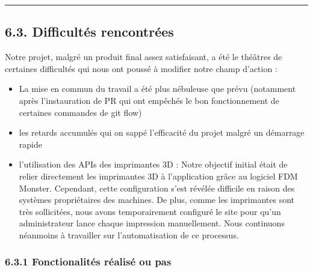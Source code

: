 \begin{center}\rule{0.5\linewidth}{0.5pt}\end{center}

\newpage

\hypertarget{difficultuxe9s-rencontruxe9es}{%
\subsection{6.3. Difficultés
rencontrées}\label{difficultuxe9s-rencontruxe9es}}

Notre projet, malgré un produit final assez satisfaisant, a été le
théâtres de certaines difficultés qui nous ont poussé à modifier notre
champ d'action :

\begin{itemize}
\item
  La mise en commun du travail a été plus nébuleuse que prévu (notamment
  après l'instauration de PR qui ont empêchés le bon fonctionnement de
  certaines commandes de git flow)
\item
  les retards accumulés qui on sappé l'efficacité du projet malgré un
  démarrage rapide
\item
  l'utilisation des APIs des imprimantes 3D : Notre objectif initial
  était de relier directement les imprimantes 3D à l'application grâce
  au logiciel FDM Monster. Cependant, cette configuration s'est révélée
  difficile en raison des systèmes propriétaires des machines. De plus,
  comme les imprimantes sont très sollicitées, nous avons temporairement
  configuré le site pour qu'un administrateur lance chaque impression
  manuellement. Nous continuons néanmoins à travailler sur
  l'automatisation de ce processus.
\end{itemize}

\hypertarget{fonctionalituxe9s-ruxe9alisuxe9-ou-pas}{%
\subsubsection{6.3.1 Fonctionalités réalisé ou
pas}\label{fonctionalituxe9s-ruxe9alisuxe9-ou-pas}}

